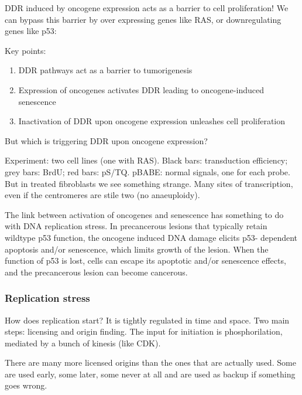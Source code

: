 DDR
induced by oncogene expression acts as a barrier to cell proliferation!
We can bypass this barrier by over expressing genes like RAS, or
downregulating genes like p53:


Key points: 
\begin{enumerate}
\item DDR pathways act as a barrier to tumorigenesis
\item Expression of oncogenes activates DDR leading to oncogene-induced
senescence
\item Inactivation of DDR upon oncogene expression unleashes
cell proliferation
\end{enumerate}

But which is triggering DDR upon oncogene expression?

Experiment: two cell lines (one with RAS). Black bars: transduction
efficiency; grey bars: BrdU; red bars: pS/TQ.
pBABE: normal signals, one for each probe. But in treated fibroblasts we
see something strange. Many sites of transcription, even if the
centromeres are stile two (no anaeuploidy).

The link between activation of oncogenes and senescence has something to
do with DNA replication stress. In precancerous lesions that typically
retain wildtype p53 function, the oncogene induced DNA damage elicits
p53- dependent apoptosis and/or senescence, which limits growth of the
lesion. When the function of p53 is lost, cells can escape its apoptotic
and/or senescence effects, and the precancerous lesion can become
cancerous.

\hypertarget{replication-stress}{%
\subsubsection{Replication stress}\label{replication-stress}}

How does replication start? It is tightly regulated in time and space.
Two main steps: licensing and origin finding. The input for initiation
is phosphorilation, mediated by a bunch of kinesis (like CDK).

There are many more licensed origins than the ones that are actually
used. Some are used early, some later, some never at all and are used as
backup if something goes wrong.

